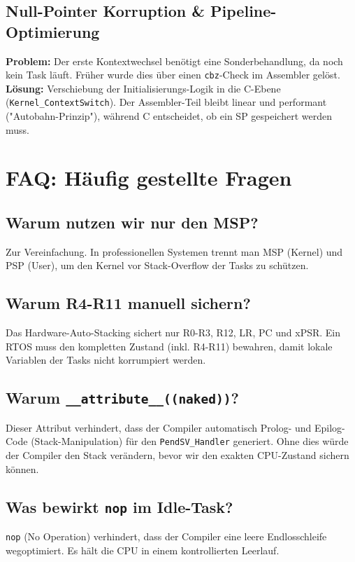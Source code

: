 \documentclass[11pt,a4paper]{article}
\begin{document}
\subsection{Null-Pointer Korruption \& Pipeline-Optimierung}
\textbf{Problem:} Der erste Kontextwechsel benötigt eine Sonderbehandlung, da noch kein Task läuft. Früher wurde dies über einen \texttt{cbz}-Check im Assembler gelöst.\\
\textbf{Lösung:} Verschiebung der Initialisierungs-Logik in die C-Ebene (\texttt{Kernel\_ContextSwitch}). Der Assembler-Teil bleibt linear und performant ("Autobahn-Prinzip"), während C entscheidet, ob ein SP gespeichert werden muss.

\section{FAQ: Häufig gestellte Fragen}

\subsection{Warum nutzen wir nur den MSP?}
Zur Vereinfachung. In professionellen Systemen trennt man MSP (Kernel) und PSP (User), um den Kernel vor Stack-Overflow der Tasks zu schützen.

\subsection{Warum R4-R11 manuell sichern?}
Das Hardware-Auto-Stacking sichert nur R0-R3, R12, LR, PC und xPSR. Ein RTOS muss den kompletten Zustand (inkl. R4-R11) bewahren, damit lokale Variablen der Tasks nicht korrumpiert werden.

\subsection{Warum \texttt{\_\_attribute__((naked))}?}
Dieser Attribut verhindert, dass der Compiler automatisch Prolog- und Epilog-Code (Stack-Manipulation) für den \texttt{PendSV\_Handler} generiert. Ohne dies würde der Compiler den Stack verändern, bevor wir den exakten CPU-Zustand sichern können.

\subsection{Was bewirkt \texttt{nop} im Idle-Task?}
\texttt{nop} (No Operation) verhindert, dass der Compiler eine leere Endlosschleife wegoptimiert. Es hält die CPU in einem kontrollierten Leerlauf.
\end{document}
